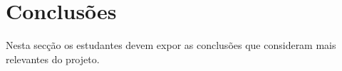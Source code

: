 \vspace{-4pt}
\section*{Conclusões}

Nesta secção os estudantes devem expor as conclusões que consideram mais relevantes do projeto.

